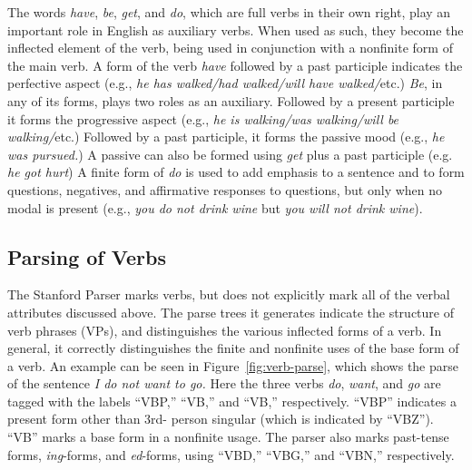 \documentclass[main.tex]{subfiles}
\begin{document}
The words \textit{have}, \textit{be}, \textit{get}, and \textit{do}, which are full verbs in their own right, play an important role in English as auxiliary verbs. When used as such, they become the inflected element of the verb, being used in conjunction with a nonfinite form of the main verb. A form of the verb \textit{have} followed by a past participle indicates the perfective aspect (e.g., \textit{he has walked/had walked/will have walked/}etc.) \textit{Be}, in any of its forms, plays two roles as an auxiliary. Followed by a present participle it forms the progressive aspect (e.g., \textit{he is walking/was walking/will be walking/}etc.) Followed by a past participle, it forms the passive mood (e.g., \textit{he was pursued.}) A passive can also be formed using \textit{get} plus a past participle (e.g. \textit{he got hurt}) A finite form of \textit{do} is used to add emphasis to a sentence and to form questions, negatives, and affirmative responses to questions, but only when no modal is present (e.g., \textit{you do not drink wine} but \textit{you will not drink wine}).

\subsection{Parsing of Verbs}

The Stanford Parser marks verbs, but does not explicitly mark all of the verbal attributes discussed above. The parse trees it generates indicate the structure of verb phrases (VPs), and distinguishes the various inflected forms of a verb. In general, it correctly distinguishes the finite and nonfinite uses of the base form of a verb. An example can be seen in Figure~\ref{fig:verb-parse}, which shows the parse of the sentence \textit{I do not want to go.} Here the three verbs \textit{do}, \textit{want}, and \textit{go} are tagged with the labels ``VBP,'' ``VB,'' and ``VB,'' respectively. ``VBP'' indicates a present form other than 3rd- person singular (which is indicated by ``VBZ''). ``VB'' marks a base form in a nonfinite usage. The parser also marks past-tense forms, \textit{ing}-forms, and \textit{ed}-forms, using ``VBD,'' ``VBG,'' and ``VBN,'' respectively. 
\end{document}
